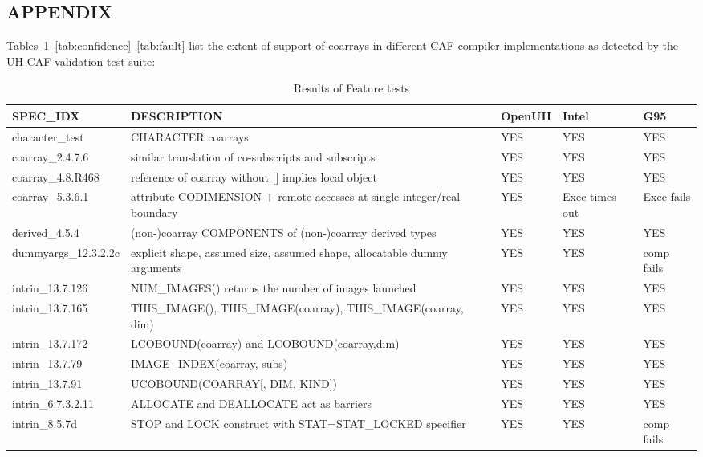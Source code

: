 \subsection{APPENDIX}

Tables~\ref{tab:feature}~\ref{tab:confidence}~\ref{tab:fault} list the extent of support of coarrays in different CAF compiler implementations as detected by the UH CAF validation test suite:

\begin{table}[tbh!]
\caption{Results of Feature tests}
\label{tab:feature}
\begin{tabular}{|l|p{7cm}|p{1.5cm}|p{1.5cm}|p{1.5cm}|}
\hline
SPEC\_IDX              &  DESCRIPTION  & OpenUH & Intel & G95 \\\hline
character\_test        &  CHARACTER coarrays & YES & YES & YES\\\hline
coarray\_2.4.7.6       &  similar translation of co-subscripts and subscripts & YES & YES & YES \\\hline
coarray\_4.8.R468      &  reference of coarray without [] implies local object & YES & YES & YES \\\hline
coarray\_5.3.6.1       &  attribute CODIMENSION + remote accesses at single integer/real boundary & YES & Exec times out & Exec fails\\\hline
derived\_4.5.4         &  (non-)coarray COMPONENTS of (non-)coarray derived types & YES & YES & YES \\\hline
dummyargs\_12.3.2.2c   &  explicit shape, assumed size, assumed shape, allocatable dummy arguments & YES & YES & comp fails\\\hline
intrin\_13.7.126       &  NUM\_IMAGES() returns the number of images launched & YES & YES & YES\\\hline
intrin\_13.7.165       &  THIS\_IMAGE(), THIS\_IMAGE(coarray), THIS\_IMAGE(coarray, dim) & YES & YES & YES\\\hline
intrin\_13.7.172       &  LCOBOUND(coarray) and LCOBOUND(coarray,dim) & YES & YES & YES\\\hline
intrin\_13.7.79        &  IMAGE\_INDEX(coarray, subs) & YES & YES & YES\\\hline
intrin\_13.7.91        &  UCOBOUND(COARRAY[, DIM, KIND]) & YES & YES & YES\\\hline
intrin\_6.7.3.2.11     &  ALLOCATE and DEALLOCATE act as barriers & YES & YES & YES\\\hline
intrin\_8.5.7d         &  STOP and LOCK construct with STAT=STAT\_LOCKED specifier & YES & YES & comp fails\\\hline

\end{tabular}
\end{table}
